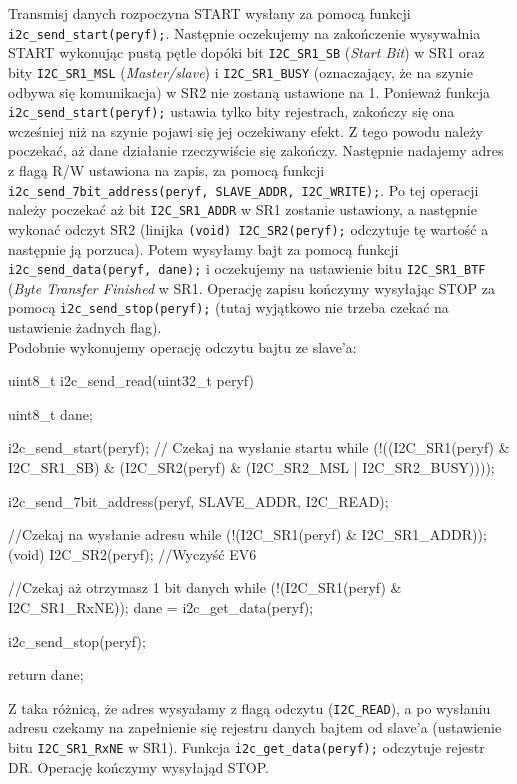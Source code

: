 \documentclass{pdfBooklets}
\begin{document}
Transmisj danych rozpoczyna START wysłany za pomocą funkcji \Verb$i2c_send_start(peryf);$. Następnie oczekujemy na zakończenie wysywałnia START
wykonując pustą pętle dopóki bit \Verb$I2C_SR1_SB$ (\textit{Start Bit}) w SR1 oraz bity \Verb$I2C_SR1_MSL$ (\textit{Master/slave}) i
\Verb$I2C_SR1_BUSY$ (oznaczający, że na szynie odbywa się komunikacja) w SR2 nie zostaną ustawione na 1. Ponieważ funkcja \Verb$i2c_send_start(peryf);$
ustawia tylko bity rejestrach, zakończy się ona wcześniej niż na szynie pojawi się jej oczekiwany efekt. Z tego powodu należy poczekać, aż dane
działanie rzeczywiście się zakończy. Następnie nadajemy adres z flagą R/W ustawiona na zapis, za pomocą funkcji
\Verb$i2c_send_7bit_address(peryf, SLAVE_ADDR, I2C_WRITE);$. Po tej operacji należy poczekać aż bit \Verb$I2C_SR1_ADDR$ w SR1 zostanie ustawiony, a
następnie wykonać odczyt SR2 (linijka \Verb$(void) I2C_SR2(peryf);$ odczytuje tę wartość a następnie ją porzuca). Potem wysyłamy bajt za pomocą
funkcji \Verb$i2c_send_data(peryf, dane);$ i oczekujemy na ustawienie bitu \Verb$I2C_SR1_BTF$ (\textit{Byte Transfer Finished} w SR1.
Operację zapisu kończymy wysyłając STOP za pomocą \Verb$i2c_send_stop(peryf);$ (tutaj wyjątkowo nie trzeba czekać na ustawienie żadnych flag).\\

Podobnie wykonujemy operację odczytu bajtu ze slave'a:

\begin{CodeFrame*}[c]{}
uint8_t i2c_send_read(uint32_t peryf){
  uint8_t dane;
  
  i2c_send_start(peryf);
  // Czekaj na wysłanie startu
  while (!((I2C_SR1(peryf) & I2C_SR1_SB)
	   & (I2C_SR2(peryf) & (I2C_SR2_MSL | I2C_SR2_BUSY))));
  
  i2c_send_7bit_address(peryf, SLAVE_ADDR, I2C_READ);

  //Czekaj na wysłanie adresu
  while (!(I2C_SR1(peryf) & I2C_SR1_ADDR));
  (void) I2C_SR2(peryf); //Wyczyść EV6

  //Czekaj aż otrzymasz 1 bit danych
  while (!(I2C_SR1(peryf) & I2C_SR1_RxNE));
  dane = i2c_get_data(peryf);
  
 
  i2c_send_stop(peryf);

  return dane;
}
\end{CodeFrame*}

Z taka różnicą, że adres wysyałamy z flagą odczytu (\Verb$I2C_READ$), a po wysłaniu adresu czekamy na zapełnienie się rejestru danych bajtem od
slave'a (ustawienie bitu \Verb$I2C_SR1_RxNE$ w SR1). Funkcja \Verb$i2c_get_data(peryf);$ odczytuje rejestr DR. Operację kończymy wysyłająd STOP. \\
\end{document}
